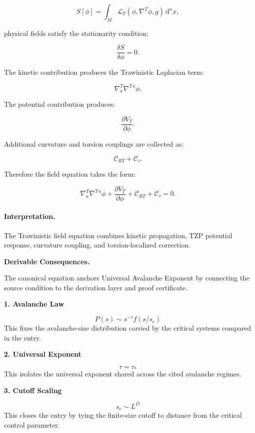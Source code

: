 \begin{equation}
S[\phi]
=
\int_M
\mathcal{L}_T
\left(
\phi,\nabla^T\phi,g
\right)
\,\mathrm{d}^n x ,
\end{equation}

physical fields satisfy the stationarity condition:

\begin{equation}
\frac{\delta S}{\delta\phi}=0 .
\end{equation}

The kinetic contribution produces the Trawinistic Laplacian term:

\begin{equation}
\nabla^T_a\nabla^{T\,a}\phi .
\end{equation}

The potential contribution produces:

\begin{equation}
\frac{\partial V_T}{\partial \phi}.
\end{equation}

Additional curvature and torsion couplings are collected as:

\begin{equation}
\mathcal{C}_{RT}
+
\mathcal{C}_{\tau}.
\end{equation}

Therefore the field equation takes the form:

\begin{equation}
\boxed{
\nabla^T_a\nabla^{T\,a}\phi
+
\frac{\partial V_T}{\partial \phi}
+
\mathcal{C}_{RT}
+
\mathcal{C}_{\tau}
=
0 .
}
\end{equation}

\paragraph{Interpretation.}
The Trawinistic field equation combines kinetic propagation, TZP potential response, curvature coupling, and torsion-localized correction.

\par\vspace{0.35em}
\noindent\textbf{Derivable Consequences.}\quad
\begingroup
\footnotesize
\raggedright
The canonical equation anchors Universal Avalanche Exponent by connecting the source condition to the derivation layer and proof certificate.
\par\endgroup

\noindent\textbf{1. Avalanche Law}\par
\[
P(s)\sim s^{-\tau}f(s/s_{c})
\]
\noindent This fixes the avalanche-size distribution carried by the critical systems compared in the entry.\par
\noindent\textbf{2. Universal Exponent}\par
\[
\tau=\tau_{\ast}
\]
\noindent This isolates the universal exponent shared across the cited avalanche regimes.\par
\noindent\textbf{3. Cutoff Scaling}\par
\[
s_{c}\sim L^{D}
\]
\noindent This closes the entry by tying the finite-size cutoff to distance from the critical control parameter.\par

